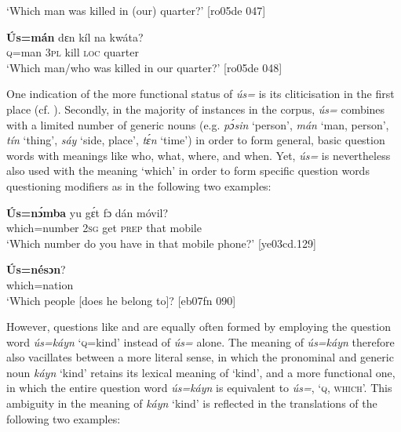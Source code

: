\glt ‘Which man was killed in (our) quarter?’ [ro05de 047]
\z


\ea%
    \label{ex:key:615}
    \gll \textbf{\'{U}s=mán}  dɛn  kíl  na  kwáta?\\
\textsc{q}=man  \textsc{3pl}  kill  \textsc{loc}  quarter\\

\glt ‘Which man/who was killed in our quarter?’ [ro05de 048]
\z

One indication of the more functional status of \textit{ús=} is its cliticisation in the first place (cf. ). Secondly, in the majority of instances in the corpus, \textit{ús=} combines with a limited number of generic nouns (e.g. \textit{pɔ́sin} ‘person’, \textit{mán} ‘man, person’, \textit{tín} ‘thing’, \textit{sáy} ‘side, place’, \textit{tɛ́n} ‘time’) in order to form general, basic question words with meanings like who, what, where, and when. Yet, \textit{ús=} is nevertheless also used with the meaning ‘which’ in order to form specific question words questioning modifiers as in the following two examples: 


\ea%
    \label{ex:key:616}
    \gll \textbf{\'{U}s=nɔ́mba}    yu  gɛ́t  fɔ  dán  móvil?\\
which=number  \textsc{2sg}  get  \textsc{prep}  that  mobile\\

\glt ‘Which number do you have in that mobile phone?’ [ye03cd.129]
\z


\ea%
    \label{ex:key:617}
    \gll \textbf{\'{U}s=nésɔn}?\\
which=nation\\

\glt ‘Which people [does he belong to]? [eb07fn 090]
\z

However, questions like  and  are equally often formed by employing the question word \textit{ús=káyn} ‘\textsc{q}=kind’ instead of \textit{ús=} alone. The meaning of \textit{ús=káyn} therefore also vacillates between a more literal sense, in which the pronominal and generic noun \textit{káyn} ‘kind’ retains its lexical meaning of ‘kind’, and a more functional one, in which the entire question word \textit{ús=káyn} is equivalent to \textit{ús=}, ‘\textsc{q,} \textsc{which’.} This ambiguity in the meaning of \textit{káyn} ‘kind’ is reflected in the translations of the following two examples:


\ea%
    \label{ex:key:618}
\z
\z


